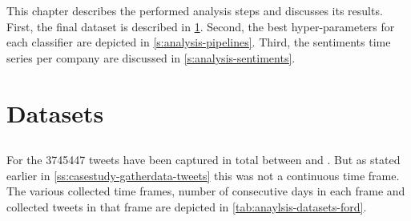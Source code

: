 
This chapter describes the performed analysis steps and discusses its results.
First, the final dataset is described in \cref{s:analysis-datasets}.
Second, the best hyper-parameters for each classifier are depicted in \cref{s:analysis-pipelines}.
Third, the sentiments time series per company are discussed in \cref{s:analysis-sentiments}.

\section{Datasets}
\label{s:analysis-datasets}


\subsection{\ford}
\label{ss:analysis-datasets-ford}


For the \ford{} \num{3745447}  tweets have been captured in total between  and .
But as stated earlier in \cref{ss:casestudy-gatherdata-tweets} this was not a continuous time frame.
The various collected time frames, number of consecutive days in each frame and collected tweets in that frame are depicted in \cref{tab:anaylsis-datasets-ford}.

